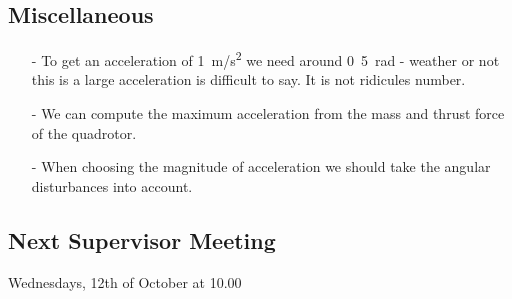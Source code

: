 \subsection{Miscellaneous}
\begin{itemize}
  \item[-] To get an acceleration of \si{1 m/s^2} we need around \si{0.5 rad} - weather or not this is a large acceleration is difficult to say. It is not ridicules number.
  \item[-] We can compute the maximum acceleration from the mass and thrust force of the quadrotor.
  \item[-] When choosing the magnitude of acceleration we should take the angular disturbances into account.
\end{itemize}

\subsection{Next Supervisor Meeting}
Wednesdays, 12th of October at 10.00

